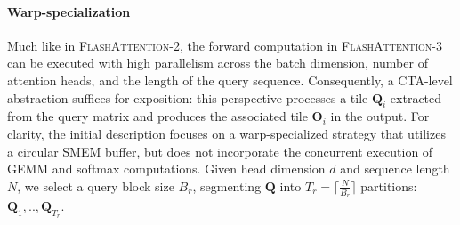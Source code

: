 \begin{enumerate}
\paragraph{Warp-specialization}
Much like in \textsc{FlashAttention-2}, the forward computation in \textsc{FlashAttention-3} can be executed with high parallelism across the batch dimension, number of attention heads, and the length of the query sequence. Consequently, a CTA-level abstraction suffices for exposition: this perspective processes a tile $\mathbf{Q}_i$ extracted from the query matrix and produces the associated tile $\mathbf{O}_i$ in the output. For clarity, the initial description focuses on a warp-specialized strategy that utilizes a circular SMEM buffer, but does not incorporate the concurrent execution of GEMM and softmax computations. Given head dimension $d$ and sequence length $N$, we select a query block size $B_r$, segmenting $\mathbf{Q}$ into $T_r = \lceil \frac{N}{B_r} \rceil$ partitions: $\mathbf{Q}_1, .., \mathbf{Q}_{T_r}$.


\end{enumerate}
